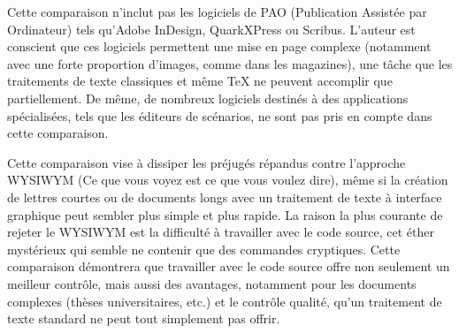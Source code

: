 \documentclass[11pt,a4paper,ngerman,french,DIV=8]{scrartcl}
\begin{document}
Cette comparaison n'inclut pas les logiciels de PAO (Publication Assistée par Ordinateur) tels qu'Adobe InDesign, QuarkXPress ou Scribus. L'auteur est conscient que ces logiciels permettent une mise en page complexe (notamment avec une forte proportion d'images, comme dans les magazines), une tâche que les traitements de texte classiques et même \TeX{} ne peuvent accomplir que partiellement. De même, de nombreux logiciels destinés à des applications spécialisées, tels que les éditeurs de scénarios, ne sont pas pris en compte dans cette comparaison.

Cette comparaison vise à dissiper les préjugés répandus contre l'approche WYSIWYM (Ce que vous voyez est ce que vous voulez dire), même si la création de lettres courtes ou de documents longs avec un traitement de texte à interface graphique peut sembler plus simple et plus rapide. La raison la plus courante de rejeter le WYSIWYM est la difficulté à travailler avec le code source, cet éther mystérieux qui semble ne contenir que des commandes cryptiques. Cette comparaison démontrera que travailler avec le code source offre non seulement un meilleur contrôle, mais aussi des avantages, notamment pour les documents complexes (thèses universitaires, etc.) et le contrôle qualité, qu'un traitement de texte standard ne peut tout simplement pas offrir.
\end{document}
